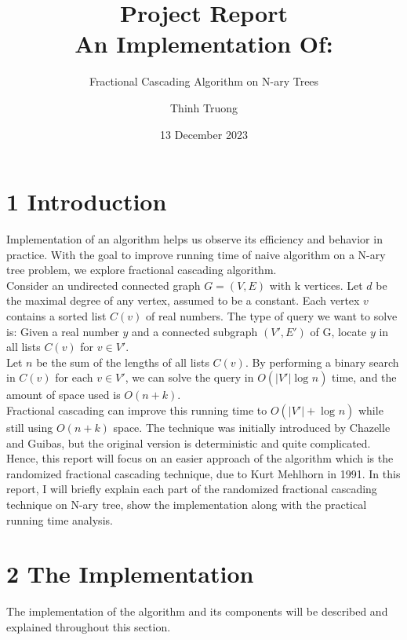 \documentclass[12pt,english,]{article}
\title{\textbf{Project Report}\\
\Large{An Implementation Of:}}
\subtitle{Fractional Cascading Algorithm on N-ary Trees}
\author{Thinh Truong}
\date{13 December 2023}
\begin{document}
\maketitle

\hypertarget{section1}{%
\section{\texorpdfstring{1
\enspace Introduction}{1 Introduction}}\label{section1}}

Implementation of an algorithm helps us observe its efficiency and behavior in practice.
With the goal to improve running time of naive algorithm on a N-ary tree problem, we explore 
fractional cascading algorithm. \\

Consider an undirected connected graph $G= (V,E)$ with k vertices. Let $d$ be the maximal
degree of any vertex, assumed to be a constant. Each vertex $v$ contains a sorted list $C(v)$
of real numbers. The type of query we want to solve is: Given a real number $y$ and a
connected subgraph $(V', E')$ of G, locate $y$ in all lists $C(v)$ for $v \in V'$. \\

Let $n$ be the sum of the lengths of all lists $C(v)$. By performing a binary search in
$C(v)$ for each $v \in V'$, we can solve the query in $O(|V'|\log_{} n)$ time, and the amount
of space used is $O(n+k)$.\\ 

Fractional cascading can improve this running time to $O(|V'|+\log_{} n)$ while still using 
$O(n+k)$ space. The technique was initially introduced by Chazelle and Guibas, but the 
original version is deterministic and quite complicated. Hence, this report will focus on an
easier approach of the algorithm which is the randomized fractional cascading technique, due 
to Kurt Mehlhorn in 1991. In this report, I will briefly explain each part of the randomized 
fractional cascading technique on N-ary tree, show the implementation along with the 
practical running time analysis. \\

\newpage


\hypertarget{section2}{%
\section{\texorpdfstring{2 \enspace The Implementation}{2 The Implementation}}\label{section2}}

The implementation of the algorithm and its components will be described and explained 
throughout this section.
\end{document}
